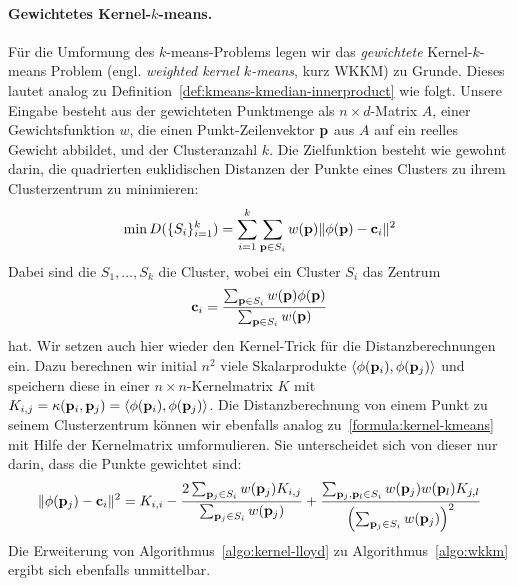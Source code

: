 \paragraph{Gewichtetes Kernel-$k$-means.} Für die Umformung des $k$-means-Problems legen wir das \emph{gewichtete}
Kernel-$k$-means Problem (engl. \emph{weighted kernel $k$-means}, kurz WKKM) zu Grunde.
Dieses lautet analog zu Definition~\ref{def:kmeans-kmedian-innerproduct} wie folgt.
Unsere Eingabe besteht aus der gewichteten Punktmenge
als $n \times d$-Matrix $A$, einer Gewichtsfunktion $w$, die einen Punkt-Zeilenvektor $\mathbf{p}$ aus $A$ auf ein reelles Gewicht
abbildet, und der Clusteranzahl $k$. Die Zielfunktion besteht wie gewohnt darin, die quadrierten euklidischen Distanzen der
Punkte eines Clusters zu ihrem Clusterzentrum zu minimieren:
\begin{align}
\label{formula:wkkm-objective}
	\min D(\{S_i\}_{i=1}^{k}) = \sum_{i=1}^{k} \sum_{\mathbf{p} \in S_i} w(\mathbf{p}) \lVert {\phi(\ensuremath{\mathbf{p}})} - {\mathbf{c}_i} \rVert^2
\end{align}
Dabei sind die $S_1, \dots, S_k$ die Cluster, wobei ein Cluster $S_i$ das Zentrum
\[ \mathbf{c}_i = \frac{\sum_{\mathbf{p} \in S_i} w(\mathbf{p}) \phi(\mathbf{p})}{\sum_{\mathbf{p} \in S_i} w(\mathbf{p})} \]
hat. Wir setzen auch hier wieder den Kernel-Trick für die Distanzberechnungen ein. Dazu berechnen wir initial $n^2$ viele
Skalarprodukte $\langle \phi(\mathbf{p}_i), \phi(\mathbf{p}_j) \rangle$ und speichern diese in einer
$n \times n$-Kernelmatrix $K$ mit $K_{i,j} = \kappa(\mathbf{p}_i, \mathbf{p}_j) = \langle \phi(\mathbf{p}_i), \phi(\mathbf{p}_j) \rangle$.
Die Distanzberechnung von einem Punkt zu seinem Clusterzentrum
können wir ebenfalls analog zu~\ref{formula:kernel-kmeans} mit Hilfe der Kernelmatrix umformulieren. Sie unterscheidet sich von
dieser nur darin, dass die Punkte gewichtet sind:
\begin{align}
\label{formula:wkkm}
	\lVert {\phi(\ensuremath{\mathbf{p}}_j)} - {\mathbf{c}_i} \rVert^2 =
	K_{i,i} - \frac{2 \sum_{\mathbf{p}_j \in S_i} w(\mathbf{p}_j) K_{i,j}}{\sum_{\mathbf{p}_j \in S_i} w(\mathbf{p}_j)}
	+ \frac{\sum_{\mathbf{p}_j, \mathbf{p}_l \in S_i} w(\mathbf{p}_j) w(\mathbf{p}_l) K_{j,l}}{\left(\sum_{\mathbf{p}_j \in S_i} w(\mathbf{p}_j)\right)^2}
\end{align}
Die Erweiterung von Algorithmus~\ref{algo:kernel-lloyd} zu Algorithmus~\ref{algo:wkkm} ergibt sich ebenfalls unmittelbar.
